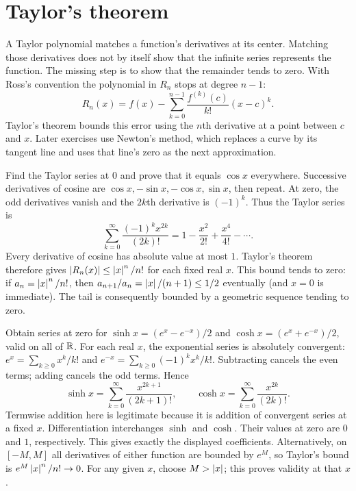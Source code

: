 \section{Taylor's theorem}
A Taylor polynomial matches a function's derivatives at its center. Matching
those derivatives does not by itself show that the infinite series represents
the function. The missing step is to show that the remainder tends to zero.
With Ross's convention the polynomial in $R_n$ stops at degree $n-1$:
\[
 R_n(x)=f(x)-\sum_{k=0}^{n-1}\frac{f^{(k)}(c)}{k!}(x-c)^k.
\]
Taylor's theorem bounds this error using the $n$th derivative at a point
between $c$ and $x$. Later exercises use Newton's method, which replaces a
curve by its tangent line and uses that line's zero as the next approximation.

\goal Find the Taylor series at $0$ and prove that it equals $\cos x$ everywhere.
Successive derivatives of cosine are $\cos x,-\sin x,-\cos x,\sin x$, then
repeat. At zero, the odd derivatives vanish and the $2k$th derivative is
$(-1)^k$. Thus the Taylor series is
\[
 \sum_{k=0}^{\infty}\frac{(-1)^k x^{2k}}{(2k)!}
 =1-\frac{x^2}{2!}+\frac{x^4}{4!}-\cdots.
\]
Every derivative of cosine has absolute value at most $1$. Taylor's theorem
therefore gives $\left|R_n(x)\right|\le \left|x\right|^n/n!$ for each fixed real $x$.
This bound tends to zero: if $a_n=\left|x\right|^n/n!$, then
$a_{n+1}/a_n=\left|x\right|/(n+1)\le1/2$ eventually (and $x=0$ is immediate).
The tail is consequently bounded by a geometric sequence tending to zero.

\goal Obtain series at zero for $\sinh x=(e^x-e^{-x})/2$ and
$\cosh x=(e^x+e^{-x})/2$, valid on all of $\mathbb{R}$.
For each real $x$, the exponential series is absolutely convergent:
$e^x=\sum_{k\ge0}x^k/k!$ and $e^{-x}=\sum_{k\ge0}(-1)^kx^k/k!$.
Subtracting cancels the even terms; adding cancels the odd terms. Hence
\[
 \sinh x=\sum_{k=0}^{\infty}\frac{x^{2k+1}}{(2k+1)!},\qquad
 \cosh x=\sum_{k=0}^{\infty}\frac{x^{2k}}{(2k)!}.
\]
Termwise addition here is legitimate because it is addition of convergent
series at a fixed $x$.
Differentiation interchanges $\sinh$ and $\cosh$. Their values at zero are
$0$ and $1$, respectively. This gives exactly the displayed coefficients.
Alternatively, on $[-M,M]$ all derivatives of either function are bounded by
$e^M$, so Taylor's bound is $e^M\left|x\right|^n/n!\to0$.
For any given $x$, choose $M>\left|x\right|$; this proves validity at that $x$.

